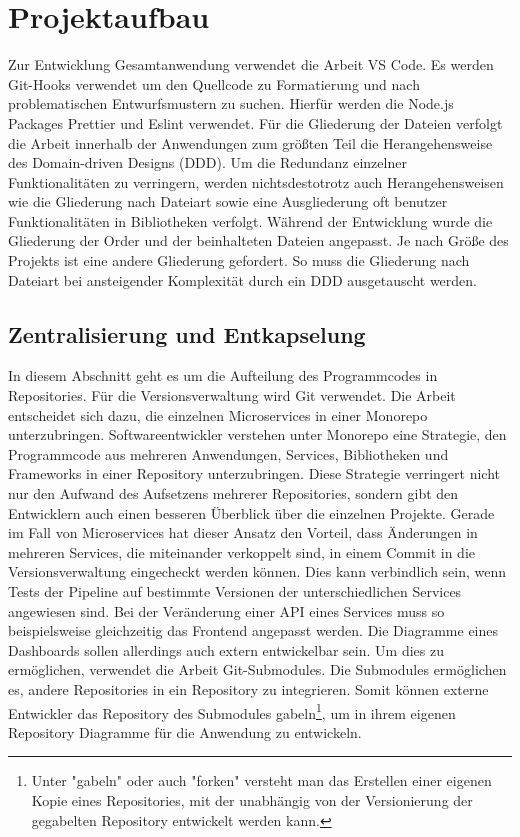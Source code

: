 \section{Projektaufbau}
\label{sec:projektaufbau}
Zur Entwicklung Gesamtanwendung verwendet die Arbeit VS Code. Es werden Git-Hooks
verwendet um den Quellcode zu Formatierung und nach problematischen Entwurfsmustern
zu suchen. Hierfür werden die Node.js Packages Prettier und Eslint verwendet.
Für die Gliederung der Dateien verfolgt die Arbeit innerhalb der Anwendungen zum größten Teil die Herangehensweise des
Domain-driven Designs (DDD). Um die Redundanz einzelner Funktionalitäten zu verringern, werden nichtsdestotrotz auch Herangehensweisen
wie die Gliederung nach Dateiart sowie eine Ausgliederung oft benutzer Funktionalitäten in Bibliotheken verfolgt. Während der Entwicklung
wurde die Gliederung der Order und der beinhalteten Dateien angepasst. Je nach Größe des Projekts ist eine andere Gliederung gefordert.
So muss die Gliederung nach Dateiart bei ansteigender Komplexität durch ein DDD ausgetauscht werden.

\subsection{Zentralisierung und Entkapselung}
\label{subsec:zentralisierungundentkapselung}
In diesem Abschnitt geht es um die Aufteilung des
Programmcodes in Repositories. Für die Versionsverwaltung
wird Git verwendet. Die Arbeit entscheidet sich dazu,
die einzelnen Microservices in einer Monorepo unterzubringen.
Softwareentwickler verstehen unter Monorepo eine Strategie, den Programmcode
aus mehreren Anwendungen, Services, Bibliotheken und Frameworks
in einer Repository unterzubringen.\cite{MonorepoTrunkBasedDevelopment}
Diese Strategie verringert nicht nur den Aufwand
des Aufsetzens mehrerer Repositories, sondern gibt den
Entwicklern auch einen besseren Überblick über die einzelnen
Projekte. Gerade im Fall von Microservices hat dieser
Ansatz den Vorteil, dass Änderungen in mehreren Services,
die miteinander verkoppelt sind, in einem Commit in die
Versionsverwaltung eingecheckt werden können. Dies kann verbindlich sein,
wenn Tests der Pipeline auf bestimmte Versionen der unterschiedlichen
Services angewiesen sind. Bei der Veränderung einer API eines Services
muss so beispielsweise gleichzeitig das Frontend angepasst werden.
Die Diagramme eines Dashboards sollen allerdings
auch extern entwickelbar sein. Um dies zu ermöglichen, verwendet
die Arbeit Git-Submodules.\cite{GitsubmodulesGitSCM} 
Die Submodules ermöglichen es, andere Repositories in ein
Repository zu integrieren. Somit können externe Entwickler das Repository des
Submodules gabeln\footnote{Unter "gabeln" oder auch "forken" versteht man
das Erstellen einer eigenen Kopie eines Repositories, mit der unabhängig von
der Versionierung der gegabelten Repository entwickelt werden kann.},
um in ihrem eigenen Repository Diagramme für die Anwendung zu entwickeln.

